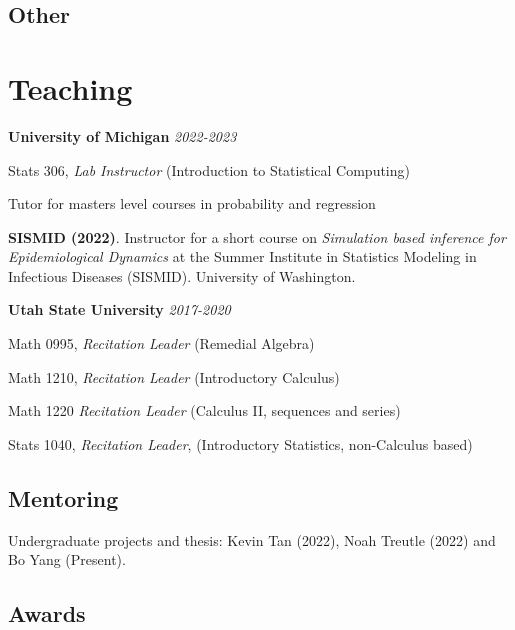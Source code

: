 \documentclass[11pt] {article}
\newenvironment {teachinglsit}
                {
                 \begin{list}{}
                 {\setlength{\labelwidth}{0mm}
                  \setlength{\leftmargin}{5mm}
                  \setlength{\labelsep}{0mm}
                  \setlength{\parsep}{0.1 ex}
                  \setlength{\itemsep}{1pt}
      \setlength{\topsep}{0.15cm}}} %
   {\end{list}}
\begin{document}
\subsection*{Other}


\section*{Teaching}

\noindent \textbf{University of Michigan} \hfill  {\textit{2022-2023}}

\begin{teachinglsit}
    \item Stats 306, {\it Lab Instructor} (Introduction to Statistical Computing)

    \item Tutor for masters level courses in probability and regression
\end{teachinglsit}

\vspace{2mm}
\noindent \textbf{SISMID (2022)}. Instructor for a short course on {\it Simulation based inference for Epidemiological Dynamics} at the Summer Institute in Statistics Modeling in Infectious Diseases (SISMID). University of Washington.

\vspace{2mm}
\noindent \textbf{Utah State University} \hfill  {\textit{2017-2020}}

\begin{teachinglsit}
    \item Math 0995, {\it Recitation Leader} (Remedial Algebra)
    \item Math 1210, {\it Recitation Leader} (Introductory Calculus)
    \item Math 1220 {\it Recitation Leader} (Calculus II, sequences and series)
    \item Stats 1040, {\it Recitation Leader}, (Introductory Statistics, non-Calculus based)
\end{teachinglsit}

\subsection*{Mentoring}

\noindent\hspace{5mm}Undergraduate projects and thesis: Kevin Tan (2022), Noah Treutle (2022) and Bo Yang (Present). 

\subsection*{Awards}
\end{document}
